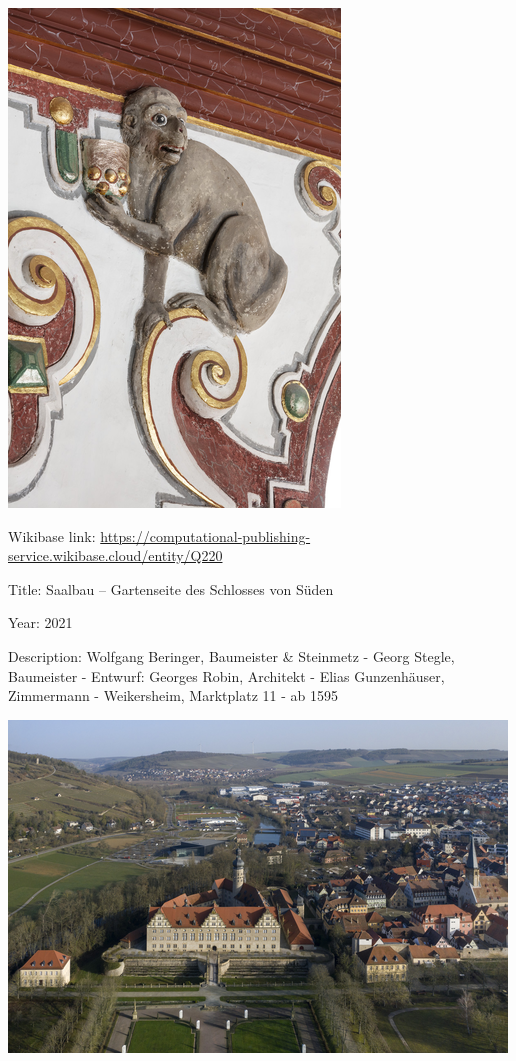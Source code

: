 \documentclass[
  letterpaper,
]{book}
\begin{document}
\includegraphics{paintings_files/figure-pdf/cell-3-output-10.png}

Wikibase link:
\url{https://computational-publishing-service.wikibase.cloud/entity/Q220}

Title: Saalbau -- Gartenseite des Schlosses von Süden

Year: 2021

Description: Wolfgang Beringer, Baumeister \& Steinmetz - Georg Stegle,
Baumeister - Entwurf: Georges Robin, Architekt - Elias Gunzenhäuser,
Zimmermann - Weikersheim, Marktplatz 11 - ab 1595

\includegraphics{paintings_files/figure-pdf/cell-3-output-12.png}
\end{document}
